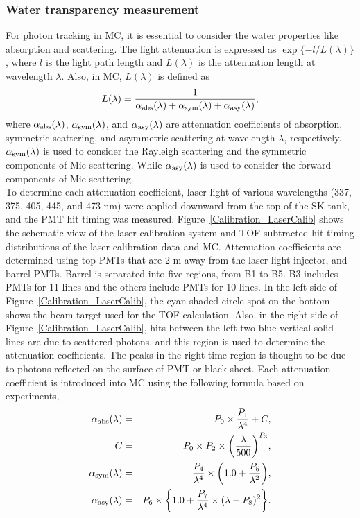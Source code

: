 \subsubsection{Water transparency measurement}\label{Subsubsec_Water}
\vs\hs
For photon tracking in MC, it is essential to consider the water properties like absorption and scattering.
The light attenuation is expressed as $\exp\{-l/L(\lambda)\}$, where $l$ is the light path length and $L(\lambda)$ is the attenuation length at wavelength $\lambda$.
Also, in MC, $L(\lambda)$ is defined as
\begin{eqnarray}
	L(\lambda)={1 \over \alpha_{\rm{abs}}(\lambda)+\alpha_{\rm{sym}}(\lambda)+\alpha_{\rm{asy}}(\lambda)},
\end{eqnarray}
where $\alpha_{\rm{abs}}(\lambda)$, $\alpha_{\rm{sym}}(\lambda)$, and $\alpha_{\rm{asy}}(\lambda)$ are attenuation coefficients of absorption, symmetric scattering, and asymmetric scattering at wavelength $\lambda$, respectively.
$\alpha_{\rm{sym}}(\lambda)$ is used to consider the Rayleigh scattering and the symmetric components of Mie scattering.
While $\alpha_{\rm{asy}}(\lambda)$ is used to consider the forward components of Mie scattering.\\
\hs
To determine each attenuation coefficient, laser light of various wavelengths (337, 375, 405, 445, and 473 nm) were applied downward from the top of the SK tank, and the PMT hit timing was measured.
Figure~\ref{Calibration_LaserCalib} shows the schematic view of the laser calibration system and TOF-subtracted hit timing distributions of the laser calibration data and MC.
Attenuation coefficients are determined using top PMTs that are 2 m away from the laser light injector, and barrel PMTs.
Barrel is separated into five regions, from B1 to B5.
B3 includes PMTs for 11 lines and the others include PMTs for 10 lines.
In the left side of Figure~\ref{Calibration_LaserCalib}, the cyan shaded circle spot on the bottom shows the beam target used for the TOF calculation.
Also, in the right side of Figure~\ref{Calibration_LaserCalib}, hits between the left two blue vertical solid lines are due to scattered photons, and this region is used to determine the attenuation coefficients.
The peaks in the right time region is thought to be due to photons reflected on the surface of PMT or black sheet.
Each attenuation coefficient is introduced into MC using the following formula based on experiments,
\begin{eqnarray}
	\alpha_{\rm{abs}}(\lambda) &=& P_{0} \times {P_{1} \over \lambda^{4}} + C, \\
	C                          &=& P_{0} \times P_{2} \times \biggl({\lambda \over 500}\biggr)^{P_{3}}, \\
	\alpha_{\rm{sym}}(\lambda) &=& {P_{4} \over \lambda^{4}} \times \biggl(1.0 + {P_{5} \over \lambda^{2}}\biggr), \\
	\alpha_{\rm{asy}}(\lambda) &=& P_{6} \times \biggl\{1.0 + {P_{7} \over \lambda^{4}} \times (\lambda - P_{8})^{2}\biggr\}.
\end{eqnarray}
